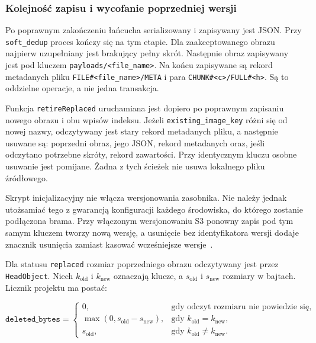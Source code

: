 \subsubsection{Kolejność zapisu i wycofanie poprzedniej wersji}

Po poprawnym zakończeniu łańcucha serializowany i zapisywany jest JSON.
Przy \texttt{soft\_dedup} proces kończy się na tym etapie.
Dla zaakceptowanego obrazu najpierw uzupełniany jest brakujący pełny
skrót. Następnie obraz zapisywany jest pod kluczem
\texttt{payloads/\allowbreak<file\_name>}.
Na końcu zapisywane są rekord metadanych pliku
\texttt{FILE\#\allowbreak<file\_name>/\allowbreak META}
i para \texttt{CHUNK\#<c>/\allowbreak FULL\#<h>}.
Są to oddzielne operacje, a nie jedna transakcja.

Funkcja \texttt{retireReplaced} uruchamiana jest dopiero po
poprawnym zapisaniu nowego obrazu i obu wpisów indeksu.
Jeżeli \texttt{existing\_image\_key} różni się od nowej nazwy,
odczytywany jest stary rekord metadanych pliku, a następnie usuwane są:
poprzedni obraz, jego JSON, rekord metadanych oraz, jeśli odczytano
potrzebne skróty, rekord zawartości.
Przy identycznym kluczu osobne usuwanie jest pomijane.
Żadna z tych ścieżek nie usuwa lokalnego pliku źródłowego.

Skrypt inicjalizacyjny nie włącza wersjonowania zasobnika.
Nie należy jednak utożsamiać tego z gwarancją konfiguracji każdego
środowiska, do którego zostanie podłączona brama.
Przy włączonym wersjonowaniu S3 ponowny zapis pod tym samym kluczem
tworzy nową wersję, a usunięcie bez identyfikatora wersji dodaje
znacznik usunięcia zamiast kasować wcześniejsze
wersje~\cite{aws_s3_versioning_workflows}.

Dla statusu \texttt{replaced} rozmiar poprzedniego obrazu
odczytywany jest przez \texttt{HeadObject}.
Niech \(k_{\mathrm{old}}\) i \(k_{\mathrm{new}}\) oznaczają klucze,
a \(s_{\mathrm{old}}\) i \(s_{\mathrm{new}}\) rozmiary w bajtach.
Licznik projektu ma postać:

\begin{equation}
\label{eq:deleted-bytes}
\texttt{deleted\_bytes}=
\begin{cases}
0, & \text{gdy odczyt rozmiaru nie powiedzie się},\\
\max(0,s_{\mathrm{old}}-s_{\mathrm{new}}),
    & \text{gdy }k_{\mathrm{old}}=k_{\mathrm{new}},\\
s_{\mathrm{old}},
    & \text{gdy }k_{\mathrm{old}}\neq k_{\mathrm{new}}.
\end{cases}
\end{equation}

